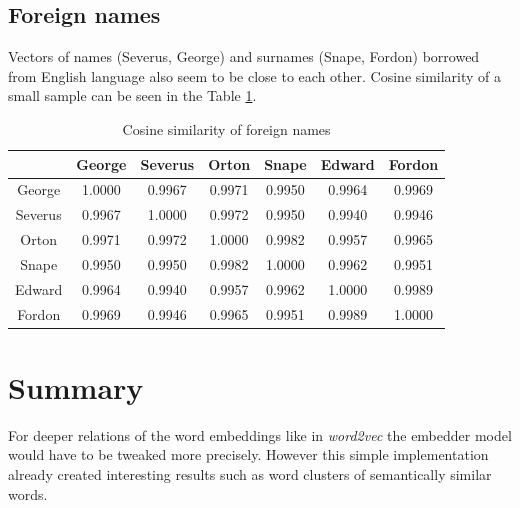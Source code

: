 \documentclass{article}
\begin{document}
  \subsection{Foreign names}
  Vectors of names (Severus, George) and surnames (Snape, Fordon) borrowed
  from English language also seem to be close to each other. Cosine similarity of
  a small sample can be seen in the Table \ref{tab:foreign_names}.
  \begin{table}[ht!]
  \center
    \begin{tabular}{|c|c|c|c|c|c|c|}
    \hline
     & George & Severus & Orton & Snape & Edward & Fordon \\ \hline
    George & 1.0000 & 0.9967 & 0.9971 & 0.9950 & 0.9964 & 0.9969 \\ \hline
    Severus & 0.9967 & 1.0000 & 0.9972 & 0.9950 & 0.9940 & 0.9946 \\ \hline
    Orton & 0.9971 & 0.9972 & 1.0000 & 0.9982 & 0.9957 & 0.9965 \\ \hline
    Snape & 0.9950 & 0.9950 & 0.9982 & 1.0000 & 0.9962 & 0.9951 \\ \hline
    Edward & 0.9964 & 0.9940 & 0.9957 & 0.9962 & 1.0000 & 0.9989 \\ \hline
    Fordon & 0.9969 & 0.9946 & 0.9965 & 0.9951 & 0.9989 & 1.0000 \\ \hline
    \end{tabular}
  \caption{Cosine similarity of foreign names}
  \label{tab:foreign_names}
  \end{table}

  \section{Summary}
  For deeper relations of the word embeddings like in \textit{word2vec} the
  embedder model would have to be tweaked more precisely. However this simple
  implementation already created interesting results such as word clusters of
  semantically similar words.
\end{document}
